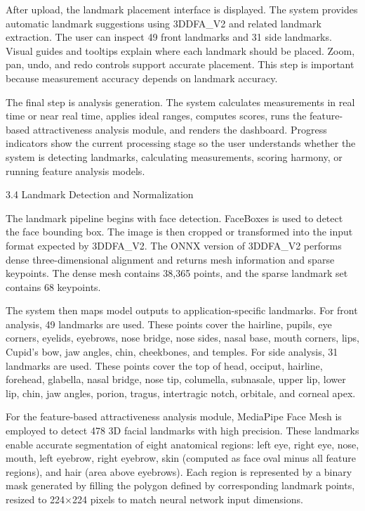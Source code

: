 After upload, the landmark placement interface is displayed. The system provides automatic landmark suggestions using 3DDFA_V2 and related landmark extraction. The user can inspect 49 front landmarks and 31 side landmarks. Visual guides and tooltips explain where each landmark should be placed. Zoom, pan, undo, and redo controls support accurate placement. This step is important because measurement accuracy depends on landmark accuracy.

The final step is analysis generation. The system calculates measurements in real time or near real time, applies ideal ranges, computes scores, runs the feature-based attractiveness analysis module, and renders the dashboard. Progress indicators show the current processing stage so the user understands whether the system is detecting landmarks, calculating measurements, scoring harmony, or running feature analysis models.

3.4  Landmark Detection and Normalization

The landmark pipeline begins with face detection. FaceBoxes is used to detect the face bounding box. The image is then cropped or transformed into the input format expected by 3DDFA_V2. The ONNX version of 3DDFA_V2 performs dense three-dimensional alignment and returns mesh information and sparse keypoints. The dense mesh contains 38,365 points, and the sparse landmark set contains 68 keypoints.

The system then maps model outputs to application-specific landmarks. For front analysis, 49 landmarks are used. These points cover the hairline, pupils, eye corners, eyelids, eyebrows, nose bridge, nose sides, nasal base, mouth corners, lips, Cupid's bow, jaw angles, chin, cheekbones, and temples. For side analysis, 31 landmarks are used. These points cover the top of head, occiput, hairline, forehead, glabella, nasal bridge, nose tip, columella, subnasale, upper lip, lower lip, chin, jaw angles, porion, tragus, intertragic notch, orbitale, and corneal apex.

For the feature-based attractiveness analysis module, MediaPipe Face Mesh is employed to detect 478 3D facial landmarks with high precision. These landmarks enable accurate segmentation of eight anatomical regions: left eye, right eye, nose, mouth, left eyebrow, right eyebrow, skin (computed as face oval minus all feature regions), and hair (area above eyebrows). Each region is represented by a binary mask generated by filling the polygon defined by corresponding landmark points, resized to 224×224 pixels to match neural network input dimensions.

